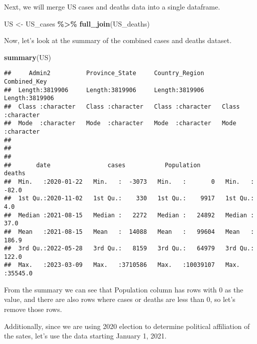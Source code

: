 \documentclass[
]{article}
\newenvironment{Shaded}{\begin{snugshade}}{\end{snugshade}}
\newcommand{\FunctionTok}[1]{\textcolor[rgb]{0.13,0.29,0.53}{\textbf{#1}}}
\newcommand{\NormalTok}[1]{#1}
\newcommand{\OtherTok}[1]{\textcolor[rgb]{0.56,0.35,0.01}{#1}}
\newcommand{\SpecialCharTok}[1]{\textcolor[rgb]{0.81,0.36,0.00}{\textbf{#1}}}
\begin{document}
Next, we will merge US cases and deaths data into a single dataframe.

\begin{Shaded}
\begin{Highlighting}[]
\NormalTok{US }\OtherTok{\textless{}{-}}\NormalTok{ US\_cases }\SpecialCharTok{\%\textgreater{}\%}
  \FunctionTok{full\_join}\NormalTok{(US\_deaths)}
\end{Highlighting}
\end{Shaded}

Now, let's look at the summary of the combined cases and deaths dataset.

\begin{Shaded}
\begin{Highlighting}[]
\FunctionTok{summary}\NormalTok{(US)}
\end{Highlighting}
\end{Shaded}

\begin{verbatim}
##     Admin2          Province_State     Country_Region     Combined_Key      
##  Length:3819906     Length:3819906     Length:3819906     Length:3819906    
##  Class :character   Class :character   Class :character   Class :character  
##  Mode  :character   Mode  :character   Mode  :character   Mode  :character  
##                                                                             
##                                                                             
##                                                                             
##       date                cases           Population           deaths       
##  Min.   :2020-01-22   Min.   :  -3073   Min.   :       0   Min.   :  -82.0  
##  1st Qu.:2020-11-02   1st Qu.:    330   1st Qu.:    9917   1st Qu.:    4.0  
##  Median :2021-08-15   Median :   2272   Median :   24892   Median :   37.0  
##  Mean   :2021-08-15   Mean   :  14088   Mean   :   99604   Mean   :  186.9  
##  3rd Qu.:2022-05-28   3rd Qu.:   8159   3rd Qu.:   64979   3rd Qu.:  122.0  
##  Max.   :2023-03-09   Max.   :3710586   Max.   :10039107   Max.   :35545.0
\end{verbatim}

From the summary we can see that Population column has rows with 0 as
the value, and there are also rows where cases or deaths are less than
0, so let's remove those rows.

Additionally, since we are using 2020 election to determine political
affiliation of the sates, let's use the data starting January 1, 2021.
\end{document}
